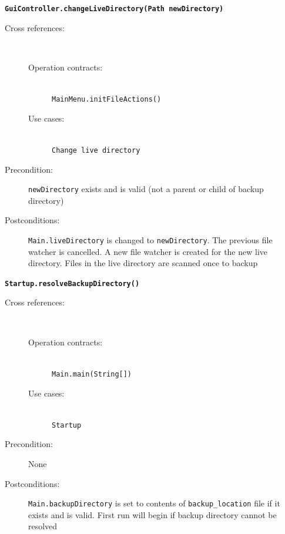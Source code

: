 \documentclass[12pt,a4paper]{article}
\begin{document}
\textbf{\texttt{GuiController.changeLiveDirectory(Path newDirectory)}}
\begin{description}
	\item[Cross references:] \hfill \vspace{-4ex}  \\
		\begin{description} 
		\item[Operation contracts:] \hfill \\
			\texttt{MainMenu.initFileActions()}
		\item[Use cases:] \hfill \\
			\texttt{Change live directory}
	\end{description}	
	\item[Precondition:] \texttt{newDirectory} exists and is valid (not a parent or child of backup directory)
	\item[Postconditions:] \texttt{Main.liveDirectory} is changed to \texttt{newDirectory}. The previous file watcher is cancelled. A new file watcher is created for the new live directory. Files in the live directory are scanned once to backup
\end{description}

\vspace{0.75cm}

\textbf{\texttt{Startup.resolveBackupDirectory()}}
\begin{description}
	\item[Cross references:] \hfill \vspace{-4ex}  \\
		\begin{description} 
		\item[Operation contracts:] \hfill \\
			\texttt{Main.main(String[])}
		\item[Use cases:] \hfill \\
			\texttt{Startup}
	\end{description}
	\item[Precondition:] None
	\item[Postconditions:] \texttt{Main.backupDirectory} is set to contents of \texttt{backup\_{}location} file if it exists and is valid. First run will begin if backup directory cannot be resolved
\end{description}

\vspace{0.75cm}
\end{document}
